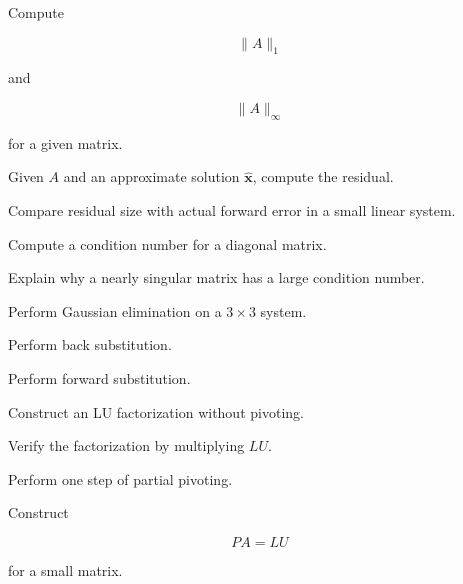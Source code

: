 \begin{exercise}[2]
Compute

\[
\|A\|_1
\]

and

\[
\|A\|_\infty
\]

for a given matrix.
\end{exercise}

\begin{exercise}[2]
Given \(A\) and an approximate solution \(\widehat{\mathbf{x}}\), compute
the residual.
\end{exercise}

\begin{exercise}[3]
Compare residual size with actual forward error in a small linear system.
\end{exercise}

\begin{exercise}[3]
Compute a condition number for a diagonal matrix.
\end{exercise}

\begin{exercise}[3]
Explain why a nearly singular matrix has a large condition number.
\end{exercise}

\begin{exercise}[2]
Perform Gaussian elimination on a \(3\times3\) system.
\end{exercise}

\begin{exercise}[2]
Perform back substitution.
\end{exercise}

\begin{exercise}[2]
Perform forward substitution.
\end{exercise}

\begin{exercise}[3]
Construct an LU factorization without pivoting.
\end{exercise}

\begin{exercise}[3]
Verify the factorization by multiplying \(LU\).
\end{exercise}

\begin{exercise}[3]
Perform one step of partial pivoting.
\end{exercise}

\begin{exercise}[3]
Construct

\[
PA=LU
\]

for a small matrix.
\end{exercise}


